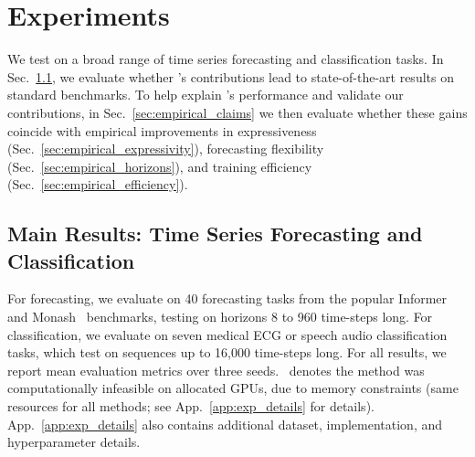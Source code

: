 %
\section{Experiments}
\label{sec:experiments}
%

We test \ourmethod{} on a broad range of time series forecasting and classification tasks. In Sec.~\ref{sec:empirical_realdata}, we evaluate whether \ourmethod{}'s contributions lead to state-of-the-art results on standard benchmarks. To help explain \ourmethod{}'s performance and validate our contributions, in Sec.~\ref{sec:empirical_claims} we then evaluate whether these gains coincide with empirical improvements in expressiveness (Sec.~\ref{sec:empirical_expressivity}), forecasting flexibility (Sec.~\ref{sec:empirical_horizons}), and training efficiency (Sec.~\ref{sec:empirical_efficiency}). 

\subsection{Main Results: Time Series Forecasting and Classification}
\label{sec:empirical_realdata}
For forecasting, we evaluate \ourmethod{} on 40 forecasting tasks from the popular Informer~\citep{zhou2021informer} and Monash~\citep{godahewa2021monash} benchmarks, testing on horizons 8 to 960 time-steps long. For classification, we evaluate \ourmethod{} on seven medical ECG 
or speech audio classification tasks, which test on sequences up to 16,000 time-steps long. For all results, we report mean evaluation metrics over three seeds. \xmark~denotes the method was computationally infeasible on allocated GPUs, \eg{} due to memory constraints (same resources for all methods; see App.~\ref{app:exp_details} for details). App.~\ref{app:exp_details} also contains additional dataset, implementation, and hyperparameter details. 

